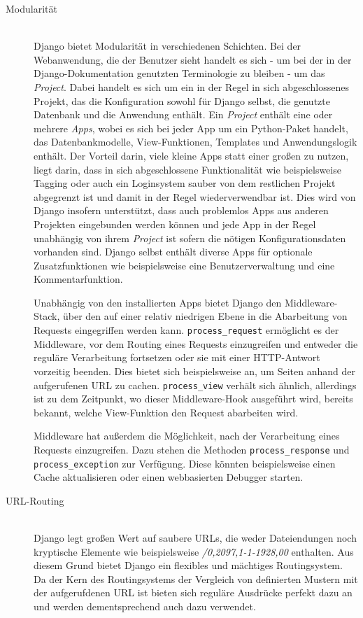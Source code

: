 \begin{description}
\item[Modularität] \hfill \\
Django bietet Modularität in verschiedenen Schichten. Bei der Webanwendung, die der Benutzer sieht
handelt es sich - um bei der in der Django-Dokumentation genutzten Terminologie zu bleiben - um das
\emph{Project}. Dabei handelt es sich um ein in der Regel in sich abgeschlossenes Projekt, das die
Konfiguration sowohl für Django selbst, die genutzte Datenbank und die Anwendung enthält. Ein
\emph{Project} enthält eine oder mehrere \emph{Apps}, wobei es sich bei jeder App um ein
Python-Paket handelt, das Datenbankmodelle, View-Funktionen, Templates und Anwendungslogik enthält.
Der Vorteil darin, viele kleine Apps statt einer großen zu nutzen, liegt darin, dass in sich
abgeschlossene Funktionalität wie beispielsweise Tagging oder auch ein Loginsystem sauber von dem
restlichen Projekt abgegrenzt ist und damit in der Regel wiederverwendbar ist. Dies wird von Django
insofern unterstützt, dass auch problemlos Apps aus anderen Projekten eingebunden werden können und
jede App in der Regel unabhängig von ihrem \emph{Project} ist sofern die nötigen Konfigurationsdaten
vorhanden sind. Django selbst enthält diverse Apps für optionale Zusatzfunktionen wie beispielsweise
eine Benutzerverwaltung und eine Kommentarfunktion.

Unabhängig von den installierten Apps bietet Django den Middleware-Stack, über den auf einer relativ
niedrigen Ebene in die Abarbeitung von Requests eingegriffen werden kann.
\lstinline{process_request} ermöglicht es der Middleware, vor dem Routing eines Requests
einzugreifen und entweder die reguläre Verarbeitung fortsetzen oder sie mit einer HTTP-Antwort
vorzeitig beenden. Dies bietet sich beispielsweise an, um Seiten anhand der aufgerufenen URL zu
cachen. \lstinline{process_view} verhält sich ähnlich, allerdings ist zu dem Zeitpunkt, wo dieser
Middleware-Hook ausgeführt wird, bereits bekannt, welche View-Funktion den Request abarbeiten wird.

Middleware hat außerdem die Möglichkeit, nach der Verarbeitung eines Requests einzugreifen. Dazu
stehen die Methoden \lstinline{process_response} und \lstinline{process_exception} zur Verfügung.
Diese könnten beispielsweise einen Cache aktualisieren oder einen webbasierten Debugger starten.


\item[URL-Routing] \hfill \\
Django legt großen Wert auf saubere URLs, die weder Dateiendungen noch kryptische Elemente wie
beispielsweise \emph{/0,2097,1-1-1928,00} enthalten. Aus diesem Grund bietet Django ein flexibles
und mächtiges Routingsystem. Da der Kern des Routingsystems der Vergleich von definierten Mustern
mit der aufgerufdenen URL ist bieten sich reguläre Ausdrücke perfekt dazu an und werden
dementsprechend auch dazu verwendet.


\end{description}

